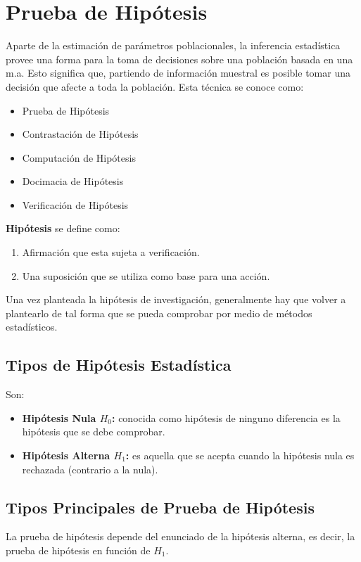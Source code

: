 \chapter{Prueba de Hipótesis}
Aparte de la estimación de parámetros poblacionales, la inferencia estadística provee una forma para la toma de decisiones sobre una población basada en una m.a. Esto significa que, partiendo de información muestral es posible tomar una decisión que afecte a toda la población. Esta técnica se conoce como:
\begin{itemize}
\item Prueba de Hipótesis
\item Contrastación de Hipótesis
\item Computación de Hipótesis
\item Docimacia de Hipótesis
\item Verificación de Hipótesis
\end{itemize}
\textbf{Hipótesis} se define como:
\begin{enumerate}
\item Afirmación que esta sujeta a verificación.
\item Una suposición que se utiliza como base para una acción.
\end{enumerate}
Una vez planteada la hipótesis de investigación, generalmente hay que volver a plantearlo de tal forma que se pueda comprobar por medio de métodos estadísticos.
\section{Tipos de Hipótesis Estadística}
Son:
\begin{itemize}
\item \textbf{Hipótesis Nula $H_0$:} conocida como hipótesis de ninguno diferencia es la hipótesis que se debe comprobar.
\item \textbf{Hipótesis Alterna $H_1$:} es aquella que se acepta cuando la hipótesis nula es rechazada (contrario a la nula).
\end{itemize}
\section{Tipos Principales de Prueba de Hipótesis}
La prueba de hipótesis depende del enunciado de la hipótesis alterna, es decir, la prueba de hipótesis en función de $H_1$.
